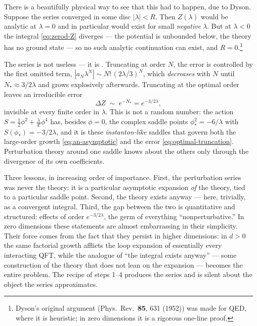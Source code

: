 \begin{eexample}
There is a beautifully physical way to see that this had to happen, due to
Dyson. Suppose the series converged in some disc $|\lambda| < R$. Then
$Z(\lambda)$ would be analytic at $\lambda = 0$ and in particular would exist
for small \emph{negative} $\lambda$. But at $\lambda < 0$ the integral
\eqref{eq:zerod-Z} diverges --- the potential is unbounded below, the theory has
no ground state --- so no such analytic continuation can exist, and $R =
0$.\footnote{Dyson's original argument (Phys.\ Rev.\ \textbf{85}, 631 (1952))
was made for QED, where it is heuristic; in zero dimensions it is a rigorous
one-line proof.}

The series is not useless --- it is . Truncating at order $N$,
the error is controlled by the first omitted term, $|a_N \lambda^N| \sim
N!\,(2\lambda/3)^N$, which \emph{decreases} with $N$ until $N_\ast \approx
3/2\lambda$ and grows explosively afterwards. Truncating at the optimal order
leaves an irreducible error
\begin{equation}
\Delta Z \;\sim\; e^{-N_\ast} = e^{-3/2\lambda} ,
\label{eq:optimal-truncation}
\end{equation}
invisible at every finite order in $\lambda$. This is not a random number: the
action $S = \frac{1}{2}\phi^2 + \frac{\lambda}{4!}\phi^4$ has, besides $\phi =
0$, the complex saddle points $\phi_\ast^2 = -6/\lambda$ with $S(\phi_\ast) =
-3/2\lambda$, and it is these \emph{instanton-like} saddles that govern both the
large-order growth \eqref{eq:an-asymptotic} and the error
\eqref{eq:optimal-truncation}. Perturbation theory around one saddle knows about
the others only through the divergence of its own coefficients.
\end{eexample}

Three lessons, in increasing order of importance. First, the perturbation series
was never the theory: it is a particular asymptotic expansion \emph{of} the
theory, tied to a particular saddle point. Second, the theory exists anyway ---
here, trivially, as a convergent integral. Third, the gap between the two is
quantitative and structured: effects of order $e^{-3/2\lambda}$, the germ of
everything ``nonperturbative.'' In zero dimensions these statements are almost
embarrassing in their simplicity. Their force comes from the fact that they
persist in higher dimensions:
in $d > 0$ the same factorial growth afflicts the loop expansion of essentially
every interacting QFT, while the analogue of ``the integral exists anyway'' ---
some construction of the theory that does not lean on the expansion --- becomes
the entire problem. The recipe of steps 1--4 produces the series and is silent
about the object the series approximates.


